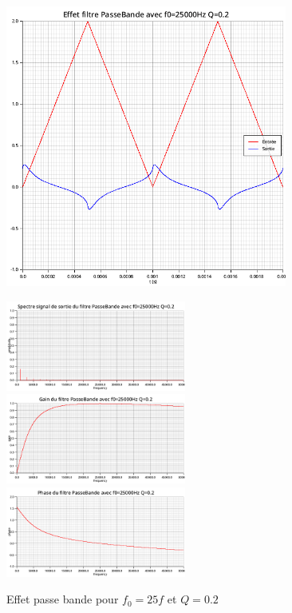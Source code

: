 \documentclass{article}
\begin{document}
\begin{figure}[H]
  \begin{minipage}{0.6\textwidth}
      \centering
      \includegraphics[width=25em]{images/triangulaire/bande/signals.png}
  \end{minipage}
  \begin{minipage}{0.3\textwidth}
      \centering
      \includegraphics[width=16em]{images/triangulaire/bande/fft_out.png}
      \vfill
      \includegraphics[width=16em]{images/triangulaire/bande/gain.png}
      \vfill
      \includegraphics[width=16em]{images/triangulaire/bande/phase.png}
  \end{minipage}
  \caption{Effet passe bande pour $f_0=25f$ et $Q=0.2$}
\end{figure}
\end{document}
